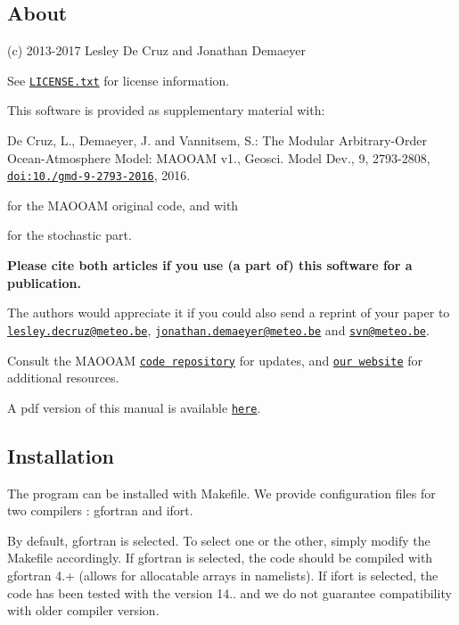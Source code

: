 \subsection*{About}

(c) 2013-\/2017 Lesley De Cruz and Jonathan Demaeyer

See \href{../../LICENSE.txt}{\tt L\+I\+C\+E\+N\+S\+E.\+txt} for license information.

This software is provided as supplementary material with\+:


\begin{DoxyItemize}
\item De Cruz, L., Demaeyer, J. and Vannitsem, S.\+: The Modular Arbitrary-\/\+Order Ocean-\/\+Atmosphere Model\+: M\+A\+O\+O\+AM v1., Geosci. Model Dev., 9, 2793-\/2808, \href{http://dx.doi.org/10.5194/gmd-9-2793-2016}{\tt doi\+:10./gmd-\/9-\/2793-\/2016}, 2016.
\end{DoxyItemize}

for the M\+A\+O\+O\+AM original code, and with


\begin{DoxyItemize}
\item for the stochastic part.
\end{DoxyItemize}

{\bfseries Please cite both articles if you use (a part of) this software for a publication.}

The authors would appreciate it if you could also send a reprint of your paper to \href{mailto:lesley.decruz@meteo.be}{\tt lesley.\+decruz@meteo.\+be}, \href{mailto:jonathan.demaeyer@meteo.be}{\tt jonathan.\+demaeyer@meteo.\+be} and \href{mailto:svn@meteo.be}{\tt svn@meteo.\+be}.

Consult the M\+A\+O\+O\+AM \href{http://www.github.com/Climdyn/MAOOAM}{\tt code repository} for updates, and \href{http://climdyn.meteo.be}{\tt our website} for additional resources.

A pdf version of this manual is available \href{../latex/Reference_manual.pdf}{\tt here}. 



\subsection*{Installation}

The program can be installed with Makefile. We provide configuration files for two compilers \+: gfortran and ifort.

By default, gfortran is selected. To select one or the other, simply modify the Makefile accordingly. If gfortran is selected, the code should be compiled with gfortran 4.+ (allows for allocatable arrays in namelists). If ifort is selected, the code has been tested with the version 14.. and we do not guarantee compatibility with older compiler version.


